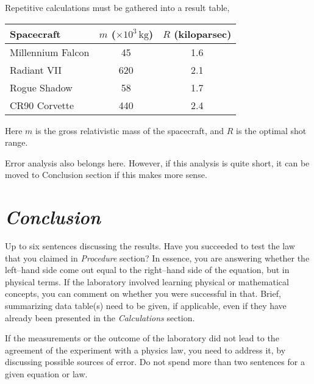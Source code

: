 \documentclass[epsfig,12pt]{article}
\begin{document}
	Repetitive calculations must be gathered into a result table,
\begin{center}
\begin{tabular}{lcc}
%
\toprule
%
	Spacecraft	&	$ m $ ($\times 10^3\,\si{\kg}$)	&	$ R $ (kiloparsec)	\\[2mm]
%
\midrule
%
	Millennium Falcon	&	45	&	1.6	\\[2mm]
	Radiant VII		&	620	&	2.1	\\[2mm]
	Rogue Shadow		&	58	&	1.7	\\[2mm]
	CR90 Corvette		&	440	&	2.4	\\[2mm]
%
\bottomrule
\end{tabular}
\end{center}
	Here $ m $ is the gross relativistic mass of the spacecraft, and $ R $ is the optimal shot range.

	Error analysis also belongs here.
	However, if this analysis is quite short, it can be moved to Conclusion section
	if this makes more sense.


\section*{\textit{Conclusion}}

	Up to six sentences discussing the results.
	Have you succeeded to test the law that you claimed in \emph{Procedure} section?
	In essence, you are answering whether the left--hand side come out equal to the right--hand side of the equation,
	but in physical terms.
	If the laboratory involved learning physical or mathematical concepts, you can comment on whether
	you were successful in that.
	Brief, summarizing data table(s) need to be given, if applicable, even if they have already been
	presented in the \textit{Calculations} section.

	If the measurements or the outcome of the laboratory did not lead to the agreement of the experiment
	with a physics law, you need to address it, by discussing possible sources of error.
	Do not spend more than two sentences for a given equation or law.
\end{document}
